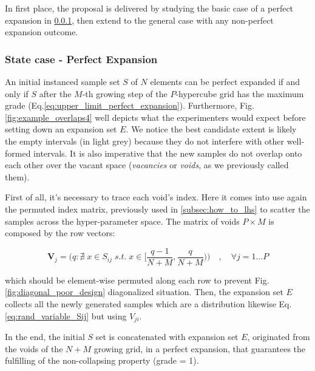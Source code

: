\documentclass[12pt]{extarticle}
\newcommand{\meqref}[1]{Eq.\ref{#1}}
\newcommand{\mfigref}[1]{Fig.\ref{#1}}
\begin{document}
In first place, the proposal is delivered by studying the basic case of a perfect expansion in \cref{subsubsec:perfect_expansion_case}, then extend to the general case with any non-perfect expansion outcome.

\subsubsection{State case - Perfect Expansion}
\label{subsubsec:perfect_expansion_case}
An initial instanced sample set $S$ of $N$ elements can be perfect expanded if and only if $S$ after the $M$-th growing step of the $P$-hypercube grid has the maximum grade (\meqref{eq:upper_limit_perfect_expansion}). Furthermore, \mfigref{fig:example_overlaps4} well depicts what the experimenters would expect before setting down an expansion set $E$. We notice the best candidate extent is likely the empty intervals (in light grey) because they do not interfere with other well-formed intervals. It is also imperative that the new samples do not overlap onto each other over the vacant space (\textit{vacancies} or \textit{voids}, as we previously called them).

First of all, it's necessary to trace each void's index. Here it comes into use again the permuted index matrix, previously used in \cref{subsec:how_to_lhs} to scatter the samples across the hyper-parameter space. The matrix of voids $P \times M$ is composed by the row vectors: 

\begin{equation}
\label{eq:voids_matrix}
\textbf{V}_j = \bigg( q : \nexists\; x \in S_{ij} \; s.t. \; x \in \Big[\frac{q-1}{N+M}, \frac{q}{N+M}\Big) \bigg) \quad, \quad \forall j = 1...P
\end{equation}

which should be element-wise permuted along each row to prevent \mfigref{fig:diagonal_poor_design} diagonalized situation.
Then, the expansion set $E$ collects all the newly generated samples which are a distribution likewise \meqref{eq:rand_variable_Sij} but using $V_{ji}$. 

In the end, the initial $S$ set is concatenated with expansion set $E$, originated from the voids of the $N+M$ growing grid, in a perfect expansion, that guarantees the fulfilling of the non-collapsing property (grade = 1). 
\end{document}
